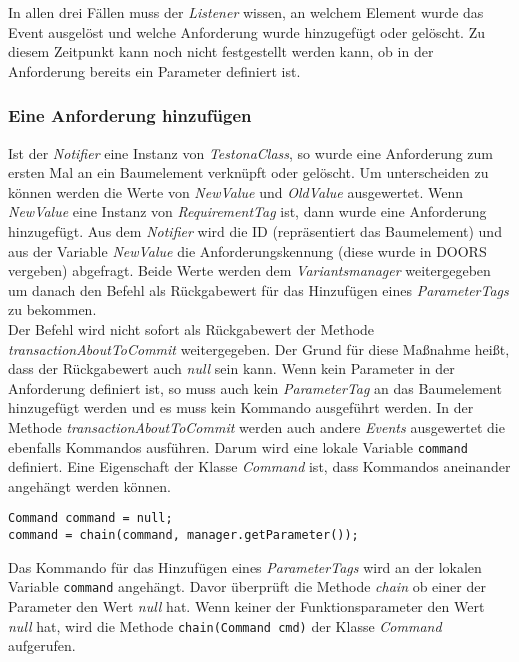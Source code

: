 In allen drei Fällen muss der \textit{Listener} wissen, an welchem Element wurde das Event ausgelöst und welche Anforderung wurde hinzugefügt oder gelöscht. Zu diesem Zeitpunkt kann noch nicht festgestellt werden kann, ob in der Anforderung bereits ein Parameter definiert ist.\\


\subsubsection{Eine Anforderung hinzufügen}
Ist der \textit{Notifier} eine Instanz von \textit{TestonaClass}, so wurde eine Anforderung zum ersten Mal an ein Baumelement verknüpft oder gelöscht. Um unterscheiden zu können werden die Werte von \textit{NewValue} und \textit{OldValue} ausgewertet. Wenn \textit{NewValue} eine Instanz von \textit{RequirementTag} ist, dann wurde eine Anforderung hinzugefügt. Aus dem \textit{Notifier} wird die ID (repräsentiert das Baumelement) und aus der Variable \textit{NewValue} die Anforderungskennung (diese wurde in DOORS vergeben) abgefragt. Beide Werte werden dem \textit{Variantsmanager} weitergegeben um danach den Befehl als Rückgabewert für das Hinzufügen eines \textit{ParameterTags} zu bekommen.\\


Der Befehl wird nicht sofort als Rückgabewert der Methode \textit{transactionAboutToCommit} weitergegeben. Der Grund für diese Maßnahme heißt, dass der Rückgabewert auch \textit{null} sein kann. Wenn kein Parameter in der Anforderung definiert ist, so muss auch kein \textit{ParameterTag} an das Baumelement hinzugefügt werden und es muss kein Kommando ausgeführt werden. In der Methode \textit{transactionAboutToCommit} werden auch andere \textit{Events} ausgewertet die ebenfalls Kommandos ausführen. Darum wird eine lokale Variable \texttt{command} definiert. Eine Eigenschaft der Klasse \textit{Command} ist, dass Kommandos aneinander angehängt werden können.

\begin{lstlisting}
Command command = null;
command = chain(command, manager.getParameter());
\end{lstlisting}

Das Kommando für das Hinzufügen eines \textit{ParameterTags} wird an der lokalen Variable \texttt{command} angehängt. Davor überprüft die Methode \textit{chain} ob einer der Parameter den Wert \textit{null} hat. Wenn keiner der Funktionsparameter den Wert \textit{null} hat, wird die Methode \texttt{chain(Command cmd)} der Klasse \textit{Command} aufgerufen.


